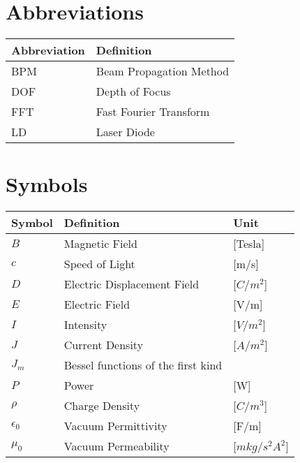 \section*{Abbreviations}

\begin{longtable}{p{2.5cm}p{8cm}}
    \toprule
    Abbreviation & Definition \\
    \midrule\endhead %
    BPM & Beam Propagation Method \\
    DOF & Depth of Focus  \\
    FFT & Fast Fourier Transform\\
    LD & Laser Diode \\
    \bottomrule
\end{longtable}

\section*{Symbols}

\begin{longtable}{p{2.5cm}p{8cm}p{2.5cm}}
    \toprule
    Symbol & Definition & Unit \\
    \midrule\endhead %
    $B$ & Magnetic Field & [Tesla] \\
    $c$ & Speed of Light & [m/s] \\
    $D$ & Electric Displacement Field & [$C/m^2$] \\
    $E$ & Electric Field & [V/m] \\
    $I$ & Intensity & [$V/m^2$] \\
    $J$ & Current Density & [$A/m^2$] \\
    $J_m$ & Bessel functions of the first kind &  \\
    $P$ & Power & [W] \\
    \midrule %
    $\rho$ & Charge Density & [$C/m^3$] \\
    $\epsilon_0$ & Vacuum Permittivity & [F/m] \\
    $\mu_0$ & Vacuum Permeability & [$m kg / s^2 A^2$] \\
    \bottomrule
\end{longtable}